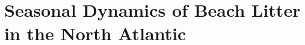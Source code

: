 \chapter{Seasonal Dynamics of Beach Litter in the North Atlantic}


\ifpdf
    \graphicspath{{content/chapter6/figs/raster/}{content/chapter6/figs/pdf/}{content/chapter6/figs/}}
\else
    \graphicspath{{content/chapter6/figs/vector/}{content/chapter6/figs/}}
\fi



